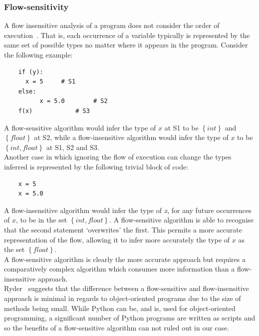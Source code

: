 \documentclass[12pt, titlepage]{article}
\begin{document}
\subsubsection{Flow-sensitivity}
A flow insensitive analysis of a program does not consider the order of execution~\cite{nielson99}. That is, each occurrence of a variable typically is represented by the same set of possible types no matter where it appears in the program. Consider the following example:
\begin{lstlisting}
	if (y):	
	  x = 5     # S1
	else:
          x = 5.0        # S2
	f(x)		    # S3
\end{lstlisting}
A flow-sensitive algorithm would infer the type of $x$ at S1 to be $\left\{ {int}\right\}$ and $\left\{ {float}\right\}$ at S2, while a flow-insensitive algorithm would infer the type of $x$ to be $\left\{ {int, float}\right\}$ at S1, S2 and S3. \\
Another case in which ignoring the flow of execution can change the types inferred is represented by the following trivial block of code:
\begin{lstlisting}
	x = 5
	x = 5.0
\end{lstlisting}
A flow-insensitive algorithm would infer the type of \textit{x}, for any future occurrences of $x$, to be in the set $\left\{ {int, float}\right\}$. A flow-sensitive algorithm is able to recognise that the second statement `overwrites' the first. This permits a more accurate representation of the flow, allowing it to infer more accurately the type of $x$ as the set $\left\{ {float}\right\}$. \\
A flow-sensitive algorithm is clearly the more accurate approach but requires a comparatively complex algorithm which consumes more information than a flow-insensitive approach. \\
Ryder~\cite{ryder03} suggests that the difference between a flow-sensitive and flow-insensitive approach is minimal in regards to object-oriented programs due to the size of methods being small. While Python can be, and is, used for object-oriented programming, a significant number of Python programs are written as scripts and so the benefits of a flow-sensitive algorithm can not ruled out in our case.
\end{document}
